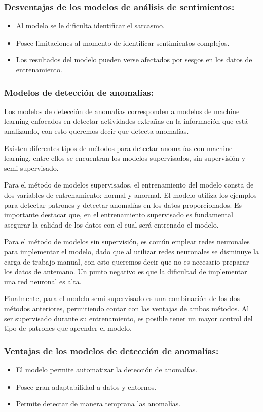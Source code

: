 \subsubsection{Desventajas de los modelos de análisis de sentimientos:}
\begin{itemize}
    \item Al modelo se le dificulta identificar el sarcasmo.
    \item Posee limitaciones al momento de identificar sentimientos complejos.
    \item Los resultados del modelo pueden verse afectados por sesgos en los datos de entrenamiento.
\end{itemize}

\subsubsection{Modelos de detección de anomalías:}
Los modelos de detección de anomalías corresponden a modelos de machine learning enfocados en detectar actividades extrañas en la información que está analizando, con esto queremos decir que detecta anomalías.

Existen diferentes tipos de métodos para detectar anomalías con machine learning, entre ellos se encuentran los modelos supervisados, sin supervisión y semi supervisado.

Para el método de modelos supervisados, el entrenamiento del modelo consta de dos variables de entrenamiento: normal y anormal. El modelo utiliza los ejemplos para detectar patrones y detectar anomalías en los datos proporcionados. Es importante destacar que, en el entrenamiento supervisado es fundamental asegurar la calidad de los datos con el cual será entrenado el modelo.

Para el método de modelos sin supervisión, es común emplear redes neuronales para implementar el modelo, dado que al utilizar redes neuronales se disminuye la carga de trabajo manual, con esto queremos decir que no es necesario preparar los datos de antemano. Un punto negativo es que la dificultad de implementar una red neuronal es alta.

Finalmente, para el modelo semi supervisado es una combinación de los dos métodos anteriores, permitiendo contar con las ventajas de ambos métodos. Al ser supervisado durante su entrenamiento, es posible tener un mayor control del tipo de patrones que aprender el modelo.

\subsubsection{Ventajas de los modelos de detección de anomalías:}
\begin{itemize}
    \item El modelo permite automatizar la detección de anomalías.
    \item Posee gran adaptabilidad a datos y entornos.
    \item Permite detectar de manera temprana las anomalías.
\end{itemize}

